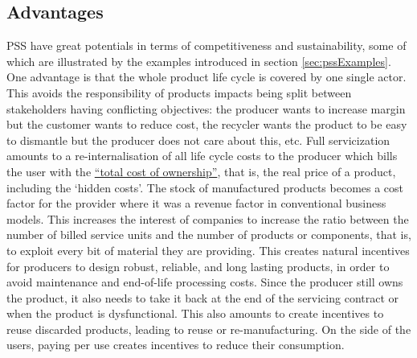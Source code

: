 \documentclass{article}
\begin{document}
\subsection{Advantages}
\label{sec:pssAdvantages}
PSS have great potentials in terms of competitiveness and sustainability, some of which are illustrated by the examples introduced in section \ref{sec:pssExamples}. One advantage is that the whole product life cycle is covered by one single actor. This avoids the responsibility of products impacts being split between stakeholders having conflicting objectives: the producer wants to increase margin but the customer wants to reduce cost, the recycler wants the product to be easy to dismantle but the producer does not care about this, etc. Full servicization amounts to a re-internalisation of all life cycle costs to the producer which bills the user with the \href{https://en.wikipedia.org/wiki/Total_cost_of_ownership}{``total cost of ownership''}, that is, the real price of a product, including the `hidden costs'. The stock of manufactured products becomes a cost factor for the provider where it was a revenue factor in conventional business models. This increases the interest of companies to increase the ratio between the number of billed service units and the number of products or components, that is, to exploit every bit of material they are providing. This creates natural incentives for producers to design robust, reliable, and long lasting products, in order to avoid maintenance and end-of-life processing costs. Since the producer still owns the product, it also needs to take it back at the end of the servicing contract or when the product is dysfunctional. This also amounts to create incentives to reuse discarded products, leading to reuse or re-manufacturing. On the side of the users, paying per use creates incentives to reduce their consumption. 



 
\end{document}
